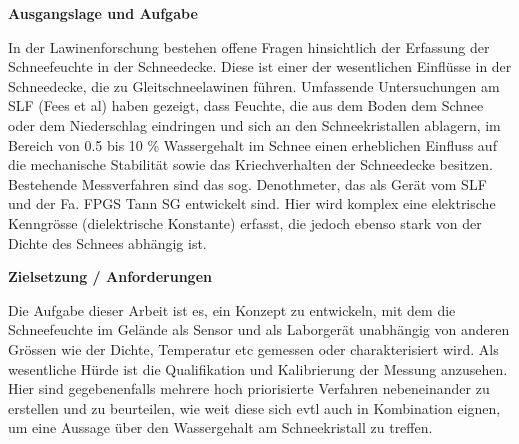 


\textbf{Ausgangslage und Aufgabe}

In der Lawinenforschung bestehen offene Fragen hinsichtlich der Erfassung der Schneefeuchte in der Schneedecke. Diese ist einer der wesentlichen Einflüsse in der Schneedecke, die zu Gleitschneelawinen führen. Umfassende Untersuchungen am SLF (Fees et al) haben gezeigt, dass Feuchte, die aus dem Boden dem Schnee oder dem Niederschlag eindringen und sich an den Schneekristallen ablagern, im Bereich von 0.5 bis 10 \% Wassergehalt im Schnee einen erheblichen Einfluss auf die mechanische Stabilität sowie das Kriechverhalten der Schneedecke besitzen.
Bestehende Messverfahren sind das sog. Denothmeter, das als Gerät vom SLF und der Fa. FPGS Tann SG entwickelt sind. Hier wird komplex eine elektrische Kenngrösse (dielektrische Konstante) erfasst, die jedoch ebenso stark von der Dichte des Schnees abhängig ist.



\textbf{Zielsetzung / Anforderungen}

Die Aufgabe dieser Arbeit ist es, ein Konzept zu entwickeln, mit dem die Schneefeuchte im Gelände als Sensor und als Laborgerät unabhängig von anderen Grössen wie der Dichte, Temperatur etc gemessen oder charakterisiert wird. Als wesentliche Hürde ist die Qualifikation und Kalibrierung der Messung anzusehen. Hier sind gegebenenfalls mehrere hoch priorisierte Verfahren nebeneinander zu erstellen und zu beurteilen, wie weit diese sich evtl auch in Kombination eignen, um eine Aussage über den Wassergehalt am Schneekristall zu treffen.



